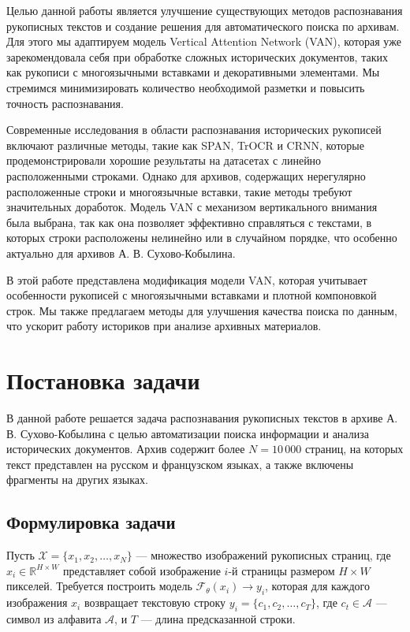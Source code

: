 \documentclass{article}
\begin{document}
    Целью данной работы является улучшение существующих методов распознавания рукописных текстов и создание решения для автоматического поиска по архивам. Для этого мы адаптируем модель Vertical Attention Network (VAN), которая уже зарекомендовала себя при обработке сложных исторических документов, таких как рукописи с многоязычными вставками и декоративными элементами. Мы стремимся минимизировать количество необходимой разметки и повысить точность распознавания.

    Современные исследования в области распознавания исторических рукописей включают различные методы, такие как SPAN, TrOCR и CRNN, которые продемонстрировали хорошие результаты на датасетах с линейно расположенными строками. Однако для архивов, содержащих нерегулярно расположенные строки и многоязычные вставки, такие методы требуют значительных доработок. Модель VAN с механизом вертикального внимания была выбрана, так как она позволяет эффективно справляться с текстами, в которых строки расположены нелинейно или в случайном порядке, что особенно актуально для архивов А. В. Сухово-Кобылина.

    В этой работе представлена модификация модели VAN, которая учитывает особенности рукописей с многоязычными вставками и плотной компоновкой строк. Мы также предлагаем методы для улучшения качества поиска по данным, что ускорит работу историков при анализе архивных материалов.

\section{Постановка задачи}

    В данной работе решается задача распознавания рукописных текстов в архиве А. В. Сухово-Кобылина с целью автоматизации поиска информации и анализа исторических документов. Архив содержит более $N = 10 \, 000$ страниц, на которых текст представлен на русском и французском языках, а также включены фрагменты на других языках.

    \subsection{Формулировка задачи}
    Пусть $\mathcal{X} = \{x_1, x_2, \dots, x_N\}$ — множество изображений рукописных страниц, где $x_i \in \mathbb{R}^{H \times W}$ представляет собой изображение $i$-й страницы размером $H \times W$ пикселей. Требуется построить модель $\mathcal{F}_{\theta}(x_i) \rightarrow y_i$, которая для каждого изображения $x_i$ возвращает текстовую строку $y_i = \{c_1, c_2, \dots, c_T\}$, где $c_t \in \mathcal{A}$ — символ из алфавита $\mathcal{A}$, и $T$ — длина предсказанной строки.
\end{document}
